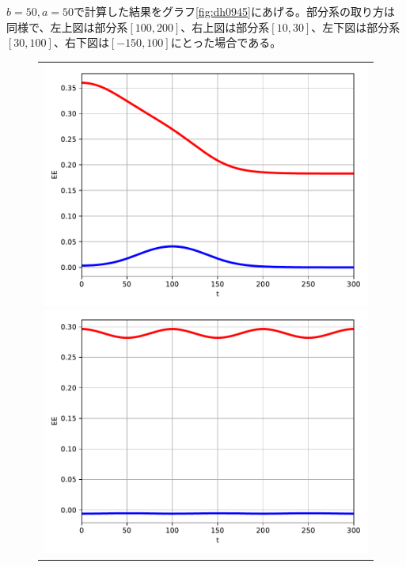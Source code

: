 $b=50,a=50$で計算した結果をグラフ\ref{fig:dh0945}にあげる。部分系の取り方は同様で、左上図は部分系$[100,200]$、右上図は部分系$[10,30]$、左下図は部分系$[30,100]$、右下図は$[-150,100]$にとった場合である。
\begin{figure}[H]
	\centering
	\begin{tabular}{c}
		\begin{minipage}{0.50\hsize}
			\centering
			\includegraphics[width=\linewidth]{dh0945_100_200.pdf}
		\end{minipage}
		\begin{minipage}{0.50\hsize}
			\centering
			\includegraphics[width=\linewidth]{dh0945_10_30.pdf}
		\end{minipage}

\end{tabular}
\end{figure}

